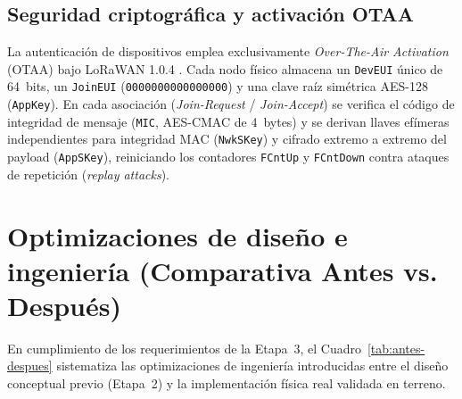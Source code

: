 \documentclass[12pt,oneside,openany,spanish,oldfontcommands]{memoir}
\begin{document}
\subsection{Seguridad criptográfica y activación OTAA}

La autenticación de dispositivos emplea exclusivamente \textit{Over-The-Air Activation} (OTAA) bajo
LoRaWAN 1.0.4 \parencite{lorawan1_0_4}. Cada nodo físico almacena un \texttt{DevEUI} único de
64~bits, un \texttt{JoinEUI} (\texttt{0000000000000000}) y una clave raíz simétrica AES-128
(\texttt{AppKey}). En cada asociación (\textit{Join-Request} / \textit{Join-Accept}) se verifica el
código de integridad de mensaje (\texttt{MIC}, AES-CMAC de 4~bytes) y se derivan llaves efímeras
independientes para integridad MAC (\texttt{NwkSKey}) y cifrado extremo a extremo del payload
(\texttt{AppSKey}), reiniciando los contadores \texttt{FCntUp} y \texttt{FCntDown} contra ataques de
repetición (\textit{replay attacks}).

\section{Optimizaciones de diseño e ingeniería (Comparativa Antes vs. Después)}\label{sec:optimizaciones-diseno}

En cumplimiento de los requerimientos de la Etapa~3, el Cuadro~\ref{tab:antes-despues} sistematiza
las optimizaciones de ingeniería introducidas entre el diseño conceptual previo (Etapa~2) y la
implementación física real validada en terreno.
\end{document}
